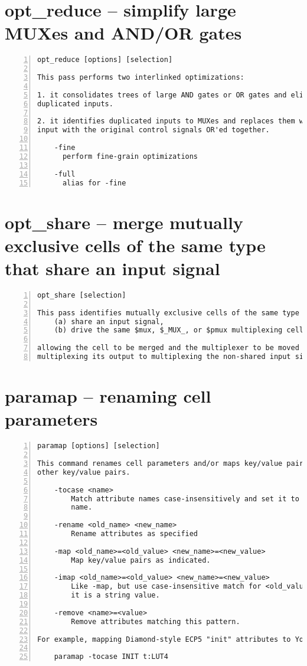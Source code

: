 \section{opt\_reduce -- simplify large MUXes and AND/OR gates}
\label{cmd:opt_reduce}
\begin{lstlisting}[numbers=left,frame=single]
    opt_reduce [options] [selection]

This pass performs two interlinked optimizations:

1. it consolidates trees of large AND gates or OR gates and eliminates
duplicated inputs.

2. it identifies duplicated inputs to MUXes and replaces them with a single
input with the original control signals OR'ed together.

    -fine
      perform fine-grain optimizations

    -full
      alias for -fine
\end{lstlisting}

\section{opt\_share -- merge mutually exclusive cells of the same type that share an input signal}
\label{cmd:opt_share}
\begin{lstlisting}[numbers=left,frame=single]
    opt_share [selection]

This pass identifies mutually exclusive cells of the same type that:
    (a) share an input signal,
    (b) drive the same $mux, $_MUX_, or $pmux multiplexing cell,

allowing the cell to be merged and the multiplexer to be moved from
multiplexing its output to multiplexing the non-shared input signals.
\end{lstlisting}

\section{paramap -- renaming cell parameters}
\label{cmd:paramap}
\begin{lstlisting}[numbers=left,frame=single]
    paramap [options] [selection]

This command renames cell parameters and/or maps key/value pairs to
other key/value pairs.

    -tocase <name>
        Match attribute names case-insensitively and set it to the specified
        name.

    -rename <old_name> <new_name>
        Rename attributes as specified

    -map <old_name>=<old_value> <new_name>=<new_value>
        Map key/value pairs as indicated.

    -imap <old_name>=<old_value> <new_name>=<new_value>
        Like -map, but use case-insensitive match for <old_value> when
        it is a string value.

    -remove <name>=<value>
        Remove attributes matching this pattern.

For example, mapping Diamond-style ECP5 "init" attributes to Yosys-style:

    paramap -tocase INIT t:LUT4
\end{lstlisting}

